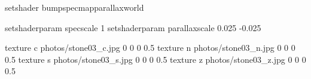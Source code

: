 setshader bumpspecmapparallaxworld

setshaderparam specscale 1
setshaderparam parallaxscale 0.025 -0.025

texture c photos/stone03_c.jpg 0 0 0 0.5
texture n photos/stone03_n.jpg 0 0 0 0.5
texture s photos/stone03_s.jpg 0 0 0 0.5
texture z photos/stone03_z.jpg 0 0 0 0.5
